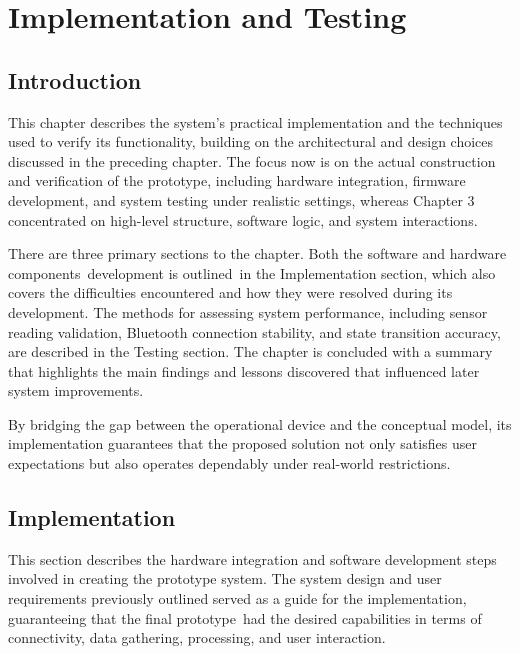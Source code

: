 \chapter{Implementation and Testing}

\section{Introduction}
This chapter describes the system's practical implementation and the techniques used to verify its functionality, building on the architectural and design choices discussed in the preceding chapter. The focus now is on the actual construction and verification of the prototype, including hardware integration, firmware development, and system testing under realistic settings, whereas Chapter 3 concentrated on high-level structure, software logic, and system interactions.

There are three primary sections to the chapter. Both the software and hardware components development is outlined in the Implementation section, which also covers the difficulties encountered and how they were resolved during its development. The methods for assessing system performance, including sensor reading validation, Bluetooth connection stability, and state transition accuracy, are described in the Testing section. The chapter is concluded with a summary that highlights the main findings and lessons discovered that influenced later system improvements.

By bridging the gap between the operational device and the conceptual model, its implementation guarantees that the proposed solution not only satisfies user expectations but also operates dependably under real-world restrictions.

\section{Implementation}
This section describes the hardware integration and software development steps involved in creating the prototype system. The system design and user requirements previously outlined served as a guide for the implementation, guaranteeing that the final prototype had the desired capabilities in terms of connectivity, data gathering, processing, and user interaction.

